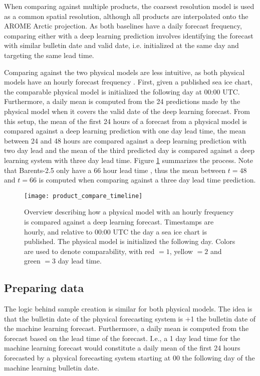 \documentclass[../main/thesis.tex]{subfiles}
\begin{document}
When comparing against multiple products, the coarsest resolution model is used as a common spatial resolution, although all products are interpolated onto the AROME Arctic projection. As both baselines have a daily forecast frequency, comparing either with a deep learning prediction involves identifying the forecast with similar bulletin date and valid date, i.e. initialized at the same day and targeting the same lead time.

Comparing against the two physical models are less intuitive, as both physical models have an hourly forecast frequency \citep{Williams2021, Roehrs2022}. First, given a published sea ice chart, the comparable physical model is initialized the following day at 00:00 UTC. Furthermore, a daily mean is computed from the 24 predictions made by the physical model when it covers the valid date of the deep learning forecast. From this setup, the mean of the first 24 hours of a forecast from a physical model is compared against a deep learning prediction with one day lead time, the mean between 24 and 48 hours are compared against a deep learning prediction with two day lead and the mean of the third predicted day is compared against a deep learning system with three day lead time. Figure \ref{fig:product_compare_timeline} summarizes the process. Note that Barents-2.5 only have a 66 hour lead time \citep{Roehrs2022}, thus the mean between $t = 48$ and $t = 66$ is computed when comparing against a three day lead time prediction.


\begin{figure}
    \centering
    \texttt{[image: product\_compare\_timeline]}
    \caption{\label{fig:product_compare_timeline}Overview describing how a physical model with an hourly frequency is compared against a deep learning forecast. Timestamps are hourly, and relative to 00:00 UTC the day a sea ice chart is published. The physical model is initialized the following day. Colors are used to denote comparability, with red $= 1$, yellow $= 2$ and green $= 3$ day lead time. }
\end{figure}


\subsection{Preparing data}
The logic behind sample creation is similar for both physical models. The idea is that the bulletin date of the physical forecasting system is +1 the bulletin date of the machine learning forecast. Furthermore, a daily mean is computed from the forecast based on the lead time of the forecast. I.e., a 1 day lead time for the machine learning forecast would constitute a daily mean of the first 24 hours forecasted by a physical forecasting system starting at 00 the following day of the machine learning bulletin date. 


\biblio
\end{document}
